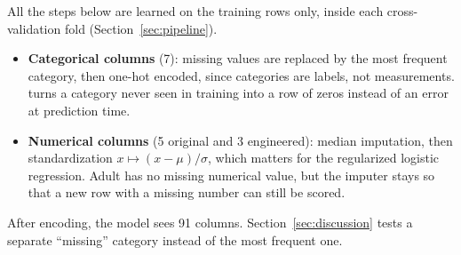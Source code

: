 All the steps below are learned on the training rows only, inside each
cross-validation fold (Section~\ref{sec:pipeline}).
\begin{itemize}
  \item \textbf{Categorical columns} (7): missing values are replaced by the
  most frequent category, then one-hot encoded, since categories are labels,
  not measurements.  turns a category never seen
  in training into a row of zeros instead of an error at prediction time.
  \item \textbf{Numerical columns} (5 original and 3 engineered): median
  imputation, then standardization $x \mapsto (x - \mu)/\sigma$, which matters
  for the regularized logistic regression. Adult has no missing numerical
  value, but the imputer stays so that a new row with a missing number can
  still be scored.
\end{itemize}
After encoding, the model sees 91 columns. Section~\ref{sec:discussion} tests a
separate ``missing'' category instead of the most frequent one.
